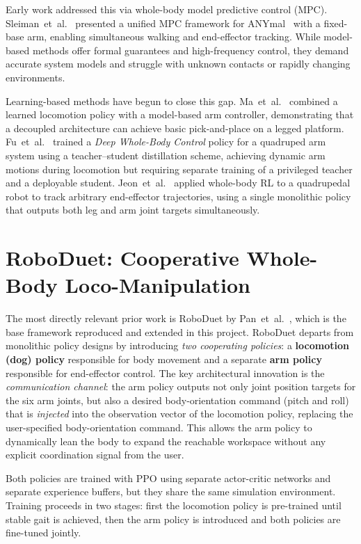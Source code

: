 Early work addressed this via whole-body model predictive control (MPC).
Sleiman~et~al.~\cite{sleiman2021unified} presented a unified MPC framework for
ANYmal~\cite{hutter2016anymal} with a fixed-base arm, enabling simultaneous
walking and end-effector tracking.
While model-based methods offer formal guarantees and high-frequency control,
they demand accurate system models and struggle with unknown contacts or
rapidly changing environments.

Learning-based methods have begun to close this gap.
Ma~et~al.~\cite{ma2022combining} combined a learned locomotion policy with a
model-based arm controller, demonstrating that a decoupled architecture can
achieve basic pick-and-place on a legged platform.
Fu~et~al.~\cite{fu2023deep} trained a \emph{Deep Whole-Body Control} policy
for a quadruped arm system using a teacher--student distillation scheme,
achieving dynamic arm motions during locomotion but requiring separate training
of a privileged teacher and a deployable student.
Jeon~et~al.~\cite{jeon2023learning} applied whole-body RL to a quadrupedal
robot to track arbitrary end-effector trajectories, using a single monolithic
policy that outputs both leg and arm joint targets simultaneously.

\section{RoboDuet: Cooperative Whole-Body Loco-Manipulation}

The most directly relevant prior work is RoboDuet by Pan~et~al.~\cite{pan2024roboduet},
which is the base framework reproduced and extended in this project.
RoboDuet departs from monolithic policy designs by introducing \emph{two
cooperating policies}: a \textbf{locomotion (dog) policy} responsible for body
movement and a separate \textbf{arm policy} responsible for end-effector
control.
The key architectural innovation is the \emph{communication channel}: the arm
policy outputs not only joint position targets for the six arm joints, but also
a desired body-orientation command (pitch and roll) that is \emph{injected} into
the observation vector of the locomotion policy, replacing the user-specified
body-orientation command.
This allows the arm policy to dynamically lean the body to expand the reachable
workspace without any explicit coordination signal from the user.

Both policies are trained with PPO using separate actor-critic networks and
separate experience buffers, but they share the same simulation environment.
Training proceeds in two stages: first the locomotion policy is pre-trained
until stable gait is achieved, then the arm policy is introduced and both
policies are fine-tuned jointly.


